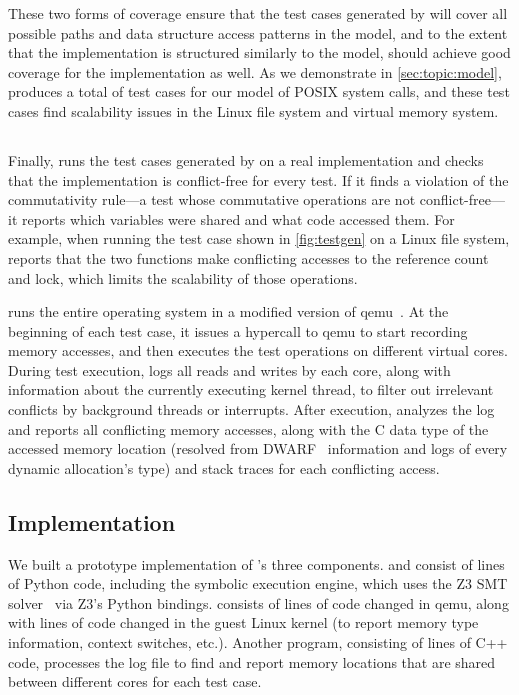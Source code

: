 These two forms of coverage ensure that the test cases
generated by \testgen will cover all possible paths and data structure
access patterns in the model, and to the extent that the implementation
is structured similarly to the model, should achieve good coverage
for the implementation as well.  As we demonstrate in \cref{sec:topic:model},
\testgen produces a total of  test cases
for our model of  POSIX
system calls, and these
test cases find scalability issues in the Linux  file system
and virtual memory system.


\subsection{\mtrace}
\label{sec:tool:mtrace}

Finally, \mtrace runs the test cases generated by \testgen on
a real implementation and checks that the implementation is
conflict-free for every test.  If it finds a violation of the
commutativity rule---a test whose commutative operations are not
conflict-free---it reports which variables were shared and what code
accessed them.
%
For example, when running the
test case shown in \cref{fig:testgen} on a Linux 
file system, \mtrace reports that the two functions make conflicting
accesses to the  reference count and lock, which limits
the scalability of those operations.

\mtrace runs the entire operating system in a modified version of
qemu~\cite{qemu}.  At the beginning of each test case, it issues a hypercall to
qemu to start recording memory accesses, and then executes the test
operations on different virtual cores.  During test execution,
\mtrace logs all reads and writes by each core, along with
information about the currently executing kernel thread,
to filter out irrelevant conflicts by background threads or
interrupts.  After execution, \mtrace analyzes
the log and reports all conflicting memory accesses, along with the C
data type of the accessed memory location (resolved from
DWARF~\cite{dwarf} information and logs
of every dynamic allocation's type) and stack traces for each conflicting
access.

\subsection{Implementation}
\label{sec:tool:impl}

We built a prototype implementation of \tool's three components.
\analyzer and \testgen consist of
 lines of Python code,
including the symbolic execution engine, which uses the Z3 SMT
solver~\cite{demoura:z3}
via Z3's Python bindings.
\mtrace consists of  lines of
code changed in qemu, along with 
lines of code changed in the guest
Linux kernel (to report memory type information, context switches, etc.).
Another program, consisting of 
lines of C++ code, processes the
log file to find and report memory locations that are shared between different
cores for each test case.

